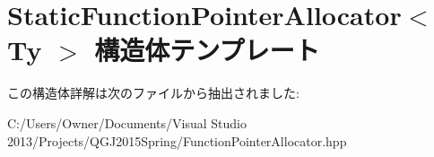 \hypertarget{struct_static_function_pointer_allocator}{}\section{Static\+Function\+Pointer\+Allocator$<$ Ty $>$ 構造体テンプレート}
\label{struct_static_function_pointer_allocator}


この構造体詳解は次のファイルから抽出されました\+:\begin{DoxyCompactItemize}
\item 
C\+:/\+Users/\+Owner/\+Documents/\+Visual Studio 2013/\+Projects/\+Q\+G\+J2015\+Spring/Function\+Pointer\+Allocator.\+hpp\end{DoxyCompactItemize}
